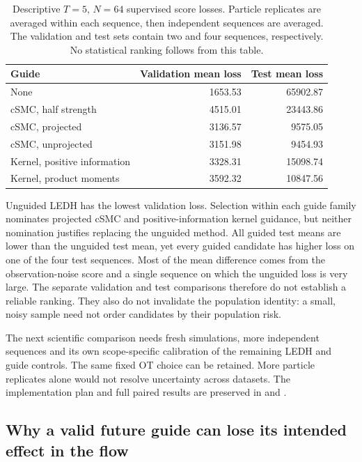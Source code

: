 \begin{table}[htbp]
\centering
\begin{tabular}{lrr}
\toprule
Guide & Validation mean loss & Test mean loss \\
\midrule
None & 1653.53 & 65902.87 \\
cSMC, half strength & 4515.01 & 23443.86 \\
cSMC, projected & 3136.57 & 9575.05 \\
cSMC, unprojected & 3151.98 & 9454.93 \\
Kernel, positive information & 3328.31 & 15098.74 \\
Kernel, product moments & 3592.32 & 10847.56 \\
\bottomrule
\end{tabular}
\caption{Descriptive $T=5$, $N=64$ supervised score losses. Particle
replicates are averaged within each sequence, then independent sequences
are averaged. The validation and test sets contain two and four sequences,
respectively. No statistical ranking follows from this table.}
\label{tab:sg-pilot}
\end{table}

Unguided LEDH has the lowest validation loss. Selection within each guide
family nominates projected cSMC and positive-information kernel guidance,
but neither nomination justifies replacing the unguided method. All guided
test means are lower than the unguided test mean, yet every guided candidate
has higher loss on one of the four test sequences. Most of the mean difference
comes from the observation-noise score and a single sequence on which the
unguided loss is very large. The separate validation and test comparisons
therefore do not establish a reliable ranking. They also do not invalidate
the population identity: a small, noisy sample need not order candidates by
their population risk.

The next scientific comparison needs fresh simulations, more independent
sequences and its own scope-specific calibration of the remaining LEDH and
guide controls. The same fixed OT choice can be retained. More particle
replicates alone would not resolve uncertainty across datasets. The
implementation plan and full paired results are preserved in
 and
.

\subsection{Why a valid future guide can lose its intended effect in the flow}
\label{sec:sg-flow-coordinates}

